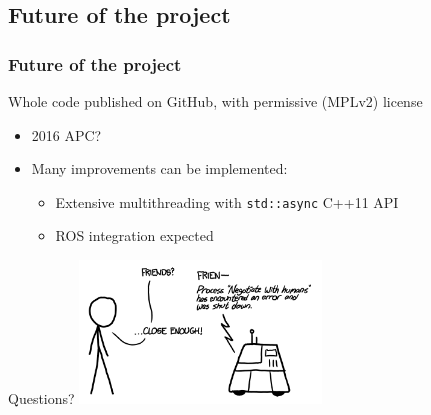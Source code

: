 \documentclass{beamer}
\begin{document}
  \subsection{Future of the project}
  \begin{frame}
    \frametitle{Future of the project}
    Whole code published on GitHub, with permissive (MPLv2) license

    \pause

    \begin{itemize}
    \item{2016 APC?}
      \pause
    \item{Many improvements can be implemented:
      \begin{itemize}
      \item{ Extensive multithreading with \texttt{std::async} C++11 API}
      \item { ROS integration expected}
    \end{itemize}}
    \end{itemize}
  \end{frame}
  \begin{frame}
    \center\Large{Questions?}
    \vspace{0.5in}
    \center\includegraphics[height=1.5in]{xkcd}
  \end{frame}
      
\end{document}
